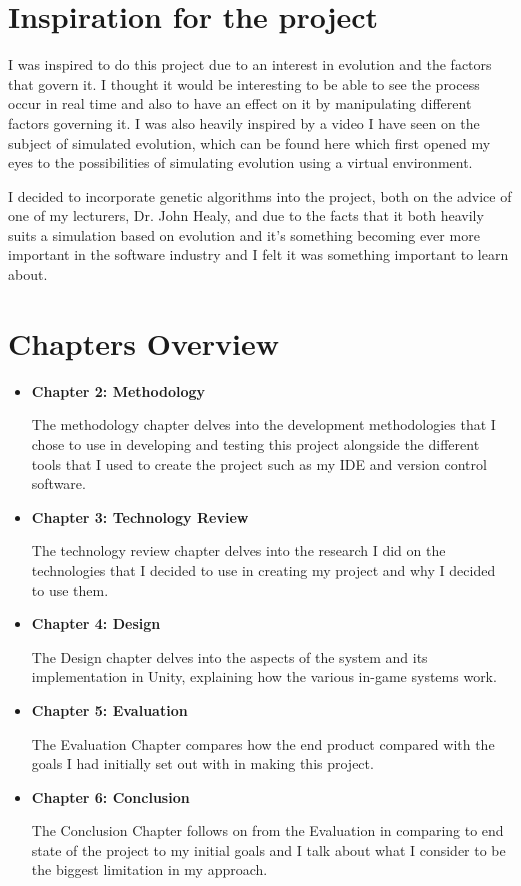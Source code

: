 \section{Inspiration for the project}
\par
I was inspired to do this project due to an interest in evolution and the factors that govern it. I thought it would be interesting to be able to see the process occur in real time and also to have an effect on it by manipulating different factors governing it. I was also heavily inspired by a video I have seen on the subject of simulated evolution, which can be found here \cite{primerNaturalSelection} which first opened my eyes to the possibilities of simulating evolution using a virtual environment. 
\par
I decided to incorporate genetic algorithms into the project, both on the advice of one of my lecturers, Dr. John Healy, and due to the facts that it both heavily suits a simulation based on evolution and it's something becoming ever more important in the software industry and I felt it was something important to learn about.
\section{Chapters Overview}
\begin{itemize}
    \item \textbf{Chapter 2: Methodology}
    \par The methodology chapter delves into the development methodologies that I chose to use in developing and testing this project alongside the different tools that I used to create the project such as my IDE and version control software.
    \item \textbf{Chapter 3: Technology Review}
    \par The technology review chapter delves into the research I did on the technologies that I decided to use in creating my project and why I decided to use them.
    \item \textbf{Chapter 4: Design}
    \par The Design chapter delves into the aspects of the system and its implementation in Unity, explaining how the various in-game systems work.
    \item \textbf{Chapter 5: Evaluation}
    \par The Evaluation Chapter compares how the end product compared with the goals I had initially set out with in making this project.
    \item \textbf{Chapter 6: Conclusion}
    \par The Conclusion Chapter follows on from the Evaluation in comparing to end state of the project to my initial goals and I talk about what I consider to be the biggest limitation in my approach.
\end{itemize}
